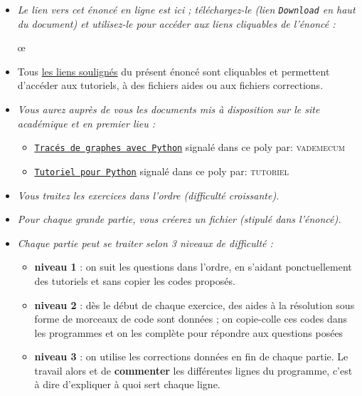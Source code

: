 \documentclass[11pt]{article}
\begin{document}
\begin{itemize}

\item \textit{Le lien vers cet énoncé en ligne est ici ; téléchargez-le (lien \texttt{Download} en haut du document) et utilisez-le pour accéder aux liens cliquables de l'énoncé : }

\begin{center}
œ\end{center}

\medskip

\item Tous \underline{les liens soulignés} du présent énoncé sont cliquables et permettent d'accéder aux tutoriels, à des fichiers aides ou aux fichiers corrections.

\item \textit{Vous aurez auprès de vous les documents mis à disposition sur le site académique et en premier lieu : }
\begin{itemize}
 \item \href{http://pedagogie.ac-limoges.fr/physique-chimie/IMG/pdf/python-trace_de_graphe.pdf}{\underline{\texttt{Tracés de graphes avec Python}}} signalé dans ce poly par: \textsc{vademecum}
 \item \href{http://pedagogie.ac-limoges.fr/physique-chimie/IMG/pdf/python-tutoriel.pdf}{\underline{\texttt{Tutoriel pour Python}}} signalé dans ce poly par: \textsc{tutoriel}
\end{itemize}

\medskip
\item \textit{Vous traitez les exercices dans l'ordre (difficulté croissante).}

\medskip
\item \textit{Pour chaque grande partie, vous créerez un fichier (stipulé dans l'énoncé).}

\medskip
\item \textit{Chaque partie peut se traiter selon 3 niveaux de difficulté :} 

\begin{itemize}
 \item \textbf{niveau 1} : on suit les questions dans l'ordre, en s'aidant ponctuellement des tutoriels et sans copier les codes proposés.
 \item \textbf{niveau 2} : dès le début de chaque exercice, des aides à la résolution sous forme de morceaux de code sont données ; on copie-colle ces codes dans les programmes et on les complète pour répondre aux questions posées
 \item \textbf{niveau 3} : on utilise les corrections données en fin de chaque partie. Le travail alors et de \textbf{commenter} les différentes lignes du programme, c'est à dire d'expliquer à quoi sert chaque ligne.
 

\end{itemize}
\end{itemize}
\end{document}
